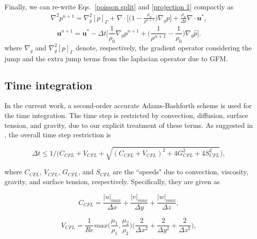 Finally, we can re-write Eqs.\ \eqref{poisson split} and \eqref{projection 1} compactly as
\begin{equation}
  \begin{aligned}
    \nabla ^2 p^{n+1} = \nabla ^2_g [p]_\Gamma + \nabla \cdot \bigg[ \big(1-\frac{\rho_0}{\rho^{n+1}}) \nabla_g \hat{p} \bigg] + \frac{\rho_0}{\Delta t} \nabla \cdot {\bm u}^*,
  \end{aligned}
  \label{gfm+split projection}
\end{equation}
\begin{equation}
    {\bm u}^{n+1} = {\bm u}^* -\Delta t \bigg[\frac{1}{\rho_0} \nabla_g p^{n+1} + \big(\frac{1}{\rho^{n+1}} - \frac{1}{\rho_0}\big) \nabla_g \hat{p} \bigg].
  \label{gfm+split correction}
\end{equation}
\noindent where $\nabla_g$ and $\nabla ^2_g [p]_\Gamma$ denote, respectively, the gradient operator considering the jump and the extra jump terms from the laplacian operator due to GFM.




\subsection{Time integration}
\label{sec: temporal}

In the current work, a second-order accurate Adams-Bashforth scheme is used for the time integration. The time step is restricted by convection, diffusion, surface tension, and gravity, due to our explicit treatment of these terms. As suggested in \cite{Kang_JSC_2000}, the overall time step restriction is

\begin{equation}
  \Delta t \leqslant 1\bigg/ \bigg(C_{CFL}+V_{CFL}+\sqrt{(C_{CFL}+V_{CFL})^2+4G_{CFL}^2+4S_{CFL}^2}\bigg),
  \label{dt}
\end{equation}

\noindent where $C_{CFL}$, $V_{CFL}$, $G_{CFL}$, and $S_{CFL}$ are the ``speeds" due to convection, viscosity, gravity, and surface tension, respectively. Specifically, they are given as

\begin{equation}
  C_{CFL} = \frac{|u|_{max}}{\Delta x}+\frac{|v|_{max}}{\Delta y}+\frac{|w|_{max}}{\Delta z},
  \label{dt conv}
\end{equation}

\begin{equation}
  V_{CFL} = \frac{1}{Re} max \bigg(\frac{\mu_1}{\rho_1},\frac{\mu_2}{\rho_2} \bigg) \bigg(\frac{2}{\Delta x^2}+\frac{2}{\Delta y^2}+\frac{2}{\Delta z^2}\bigg),
  \label{dt visc}
\end{equation}

